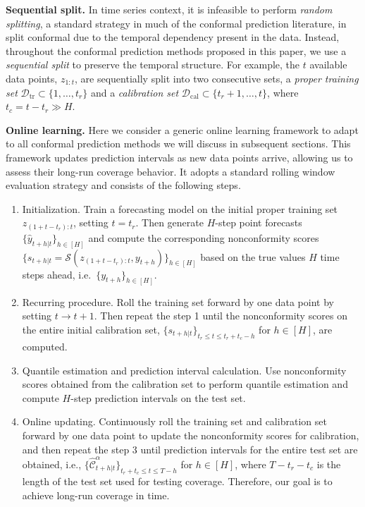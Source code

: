 \documentclass[
  11pt,
  a4paper,
]{article}
\theoremstyle{plain}
\theoremstyle{remark}
\begin{document}
\textbf{Sequential split.} In time series context, it is infeasible to
perform \emph{random splitting}, a standard strategy in much of the
conformal prediction literature, in split conformal due to the temporal
dependency present in the data. Instead, throughout the conformal
prediction methods proposed in this paper, we use a \emph{sequential
split} to preserve the temporal structure. For example, the \(t\)
available data points, \(z_{1:t}\), are sequentially split into two
consecutive sets, a \emph{proper training set}
\(\mathcal{D}_{\text{tr}} \subset \{1,\ldots,t_r\}\) and a
\emph{calibration set}
\(\mathcal{D}_{\text{cal}} \subset \{t_r+1,\ldots,t\}\), where
\(t_c=t-t_r \gg H\).

\textbf{Online learning.} Here we consider a generic online learning
framework to adapt to all conformal prediction methods we will discuss
in subsequent sections. This framework updates prediction intervals as
new data points arrive, allowing us to assess their long-run coverage
behavior. It adopts a standard rolling window evaluation strategy and
consists of the following steps.

\begin{enumerate}
\def\labelenumi{\arabic{enumi}.}
\item
  Initialization. Train a forecasting model on the initial proper
  training set \(z_{(1+t-t_r):t}\), setting \(t=t_r\). Then generate
  \(H\)-step point forecasts \(\{\hat{y}_{t+h|t}\}_{h\in[H]}\) and
  compute the corresponding nonconformity scores
  \(\{s_{t+h|t}=\mathcal{S}(z_{(1+t-t_r):t}, y_{t+h})\}_{h\in[H]}\)
  based on the true values \(H\) time steps ahead,
  i.e.~\(\{y_{t+h}\}_{h\in[H]}\).
\item
  Recurring procedure. Roll the training set forward by one data point
  by setting \(t \rightarrow t+1\). Then repeat the step 1 until the
  nonconformity scores on the entire initial calibration set,
  \(\{s_{t+h|t}\}_{t_r \leq t \leq t_r+t_c-h}\) for \(h\in[H]\), are
  computed.
\item
  Quantile estimation and prediction interval calculation. Use
  nonconformity scores obtained from the calibration set to perform
  quantile estimation and compute \(H\)-step prediction intervals on the
  test set.
\item
  Online updating. Continuously roll the training set and calibration
  set forward by one data point to update the nonconformity scores for
  calibration, and then repeat the step 3 until prediction intervals for
  the entire test set are obtained, i.e.,
  \(\{\hat{\mathcal{C}}_{t+h|t}^{\alpha}\}_{t_r+t_c \leq t \leq T-h}\)
  for \(h \in [H]\), where \(T-t_r-t_c\) is the length of the test set
  used for testing coverage. Therefore, our goal is to achieve long-run
  coverage in time.
\end{enumerate}
\end{document}
